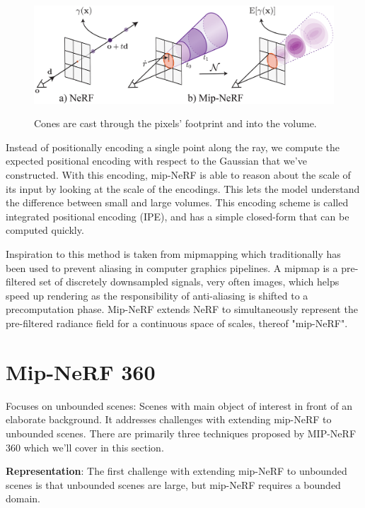 \begin{figure}[h]
    \centering
    \includegraphics[width=1.0\textwidth]{figures/MipNeRFFrustums.png}
    \caption{Cones are cast through the pixels' footprint and into the volume.}
    \label{fig:mipnerffrustums}
    \cite{figure:mipnerffrustum}
    \label{fig:my_label}
\end{figure}


Instead of positionally encoding a single point along the ray, we compute the expected positional encoding with respect to the Gaussian that we've constructed. With this encoding, mip-NeRF is able to reason about the scale of its input by looking at the scale of the encodings. This lets the model understand the difference between small and large volumes. This encoding scheme is called integrated positional encoding (IPE), and has a simple closed-form that can be computed quickly.

Inspiration to this method is taken from mipmapping which traditionally has been used to prevent aliasing in computer graphics pipelines. A mipmap is a pre-filtered set of discretely downsampled signals, very often images, which helps speed up rendering as the responsibility of anti-aliasing is shifted to a precomputation phase. Mip-NeRF extends NeRF to simultaneously represent the pre-filtered radiance field for a continuous space of scales, thereof "mip-NeRF".





\section{Mip-NeRF 360} \label{sec:mipnerf360}
Focuses on unbounded scenes: Scenes with main object of interest in front of an elaborate background. It addresses challenges with extending mip-NeRF to unbounded scenes. There are primarily three techniques proposed by MIP-NeRF 360 which we'll cover in this section.

\textbf{Representation}:
The first challenge with extending mip-NeRF to unbounded scenes is that unbounded scenes are large, but mip-NeRF requires a bounded domain.

